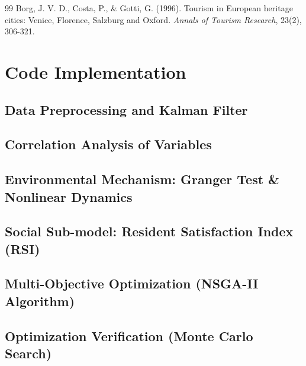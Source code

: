 \documentclass{mcmthesis}
\begin{document}
\begin{appendices}
\begin{thebibliography}{99}
    Borg, J. V. D., Costa, P., \& Gotti, G. (1996). 
    Tourism in European heritage cities: Venice, Florence, Salzburg and Oxford. 
    \textit{Annals of Tourism Research}, 23(2), 306-321.

\end{thebibliography}

\newpage
\section{Code Implementation}

\subsection{Data Preprocessing and Kalman Filter}


\subsection{Correlation Analysis of Variables}


\subsection{Environmental Mechanism: Granger Test \& Nonlinear Dynamics}


\subsection{Social Sub-model: Resident Satisfaction Index (RSI)}


\subsection{Multi-Objective Optimization (NSGA-II Algorithm)}


\subsection{Optimization Verification (Monte Carlo Search)}



\end{appendices}
\end{document}
